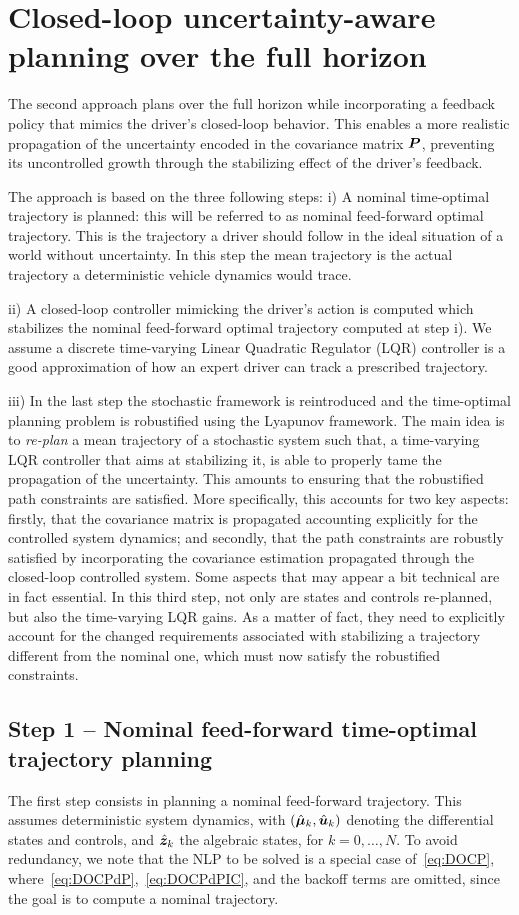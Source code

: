 \section{Closed-loop uncertainty-aware planning over the full horizon}
\label{sec:closed_loop_planning}

The second approach plans over the full horizon while incorporating a feedback policy that mimics the driver's closed-loop behavior. This enables a more realistic propagation of the uncertainty encoded in the covariance matrix $\boldsymbol{P}$, preventing its uncontrolled growth through the stabilizing effect of the driver's feedback.

The approach is based on the three following steps: i) A nominal time-optimal trajectory is planned: this will be referred to as nominal feed-forward optimal trajectory. This is the trajectory a driver should follow in the ideal situation of a world without uncertainty. In this step the mean trajectory is the actual trajectory a deterministic vehicle dynamics would trace. 

ii) A closed-loop controller mimicking the driver's action is computed which stabilizes the nominal feed-forward optimal trajectory computed at step i). We assume a discrete time-varying Linear Quadratic Regulator (LQR) controller is a good approximation of how an expert driver can track a prescribed trajectory. 

iii) In the last step the stochastic framework is reintroduced and the time-optimal planning problem is robustified using the Lyapunov framework. The main idea is to \emph{re-plan} a mean trajectory of a stochastic system such that, a time-varying LQR controller that aims at stabilizing it, is able to properly tame the propagation of the uncertainty. This amounts to ensuring that the robustified path constraints are satisfied. More specifically, this accounts for two key aspects: firstly, that the covariance matrix is propagated accounting explicitly for the controlled system dynamics; and secondly, that the path constraints are robustly satisfied by incorporating the covariance estimation propagated through the closed-loop controlled system. Some aspects that may appear a bit technical are in fact essential. In this third step, not only are states and controls re-planned, but also the time-varying LQR gains. As a matter of fact, they need to explicitly account for the changed requirements associated with stabilizing a trajectory different from the nominal one, which must now satisfy the robustified constraints.
\subsection{Step 1 -- Nominal feed-forward time-optimal trajectory planning}
\label{sec:nominalFF}
The first step consists in planning a nominal feed-forward trajectory. This assumes deterministic system dynamics, with \( (\hat{\boldsymbol{\mu}}_k, \hat{\boldsymbol{u}}_k) \) denoting the differential states and controls, and \( \hat{\boldsymbol{z}}_k \) the algebraic states, for \( k = 0, \ldots, N \). To avoid redundancy, we note that the NLP to be solved is a special case of~\eqref{eq:DOCP}, where~\eqref{eq:DOCPdP},~\eqref{eq:DOCPdPIC}, and the backoff terms are omitted, since the goal is to compute a nominal trajectory.


